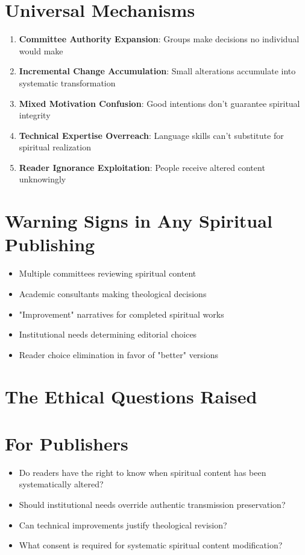 \documentclass[11pt,twoside]{book}
\begin{document}
\section*{Universal Mechanisms}
\label{sec:orgc4d949f}
\begin{enumerate}
\item \textbf{\textbf{Committee Authority Expansion}}: Groups make decisions no individual would make
\item \textbf{\textbf{Incremental Change Accumulation}}: Small alterations accumulate into systematic transformation
\item \textbf{\textbf{Mixed Motivation Confusion}}: Good intentions don't guarantee spiritual integrity
\item \textbf{\textbf{Technical Expertise Overreach}}: Language skills can't substitute for spiritual realization
\item \textbf{\textbf{Reader Ignorance Exploitation}}: People receive altered content unknowingly
\end{enumerate}
\section*{Warning Signs in Any Spiritual Publishing}
\label{sec:org33df6d3}
\begin{itemize}
\item Multiple committees reviewing spiritual content
\item Academic consultants making theological decisions
\item "Improvement" narratives for completed spiritual works
\item Institutional needs determining editorial choices
\item Reader choice elimination in favor of "better" versions
\end{itemize}
\section*{The Ethical Questions Raised}
\label{sec:orgfcba133}

\section*{For Publishers}
\label{sec:org3e2ccee}
\begin{itemize}
\item Do readers have the right to know when spiritual content has been systematically altered?
\item Should institutional needs override authentic transmission preservation?
\item Can technical improvements justify theological revision?
\item What consent is required for systematic spiritual content modification?
\end{itemize}
\end{document}
